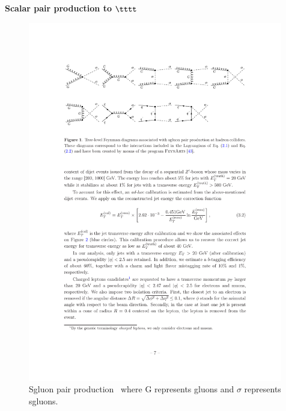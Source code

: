 
\newpage
\textbf{Scalar pair production to $\boldsymbol{\tttt}$}\\
\begin{figure}[ht!]
\centering
    \includegraphics[width=0.99\textwidth]{images/Theory/sgluonFeyn.pdf}
    \caption{Sgluon pair production~\cite{Calvet:2012rk} where G represents gluons and $\sigma$ represents sgluons.}
    \label{fig:sgluonpair}
\end{figure}

